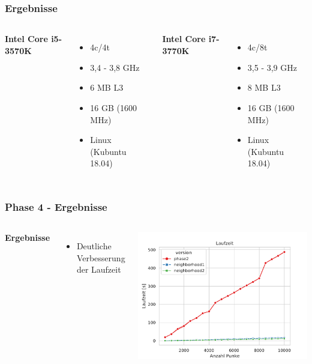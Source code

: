 \documentclass[aspectratio=169]{beamer}
\begin{document}
\begin{frame}
\frametitle{Ergebnisse}
\begin{columns}[c] %
	
	\textbf{Intel Core i5-3570K}
	\begin{itemize}
		\item 4c/4t
		\item 3,4 - 3,8 GHz
		\item 6 MB L3
		\item 16 GB (1600 MHz)
		\item Linux (Kubuntu 18.04)
	\end{itemize}
	
	\textbf{Intel Core i7-3770K}
	\begin{itemize}
		\item 4c/8t
		\item 3,5 - 3,9 GHz
		\item 8 MB L3
		\item 16 GB (1600 MHz)
		\item Linux (Kubuntu 18.04)
		
	\end{itemize}
\end{columns}
\end{frame}



\begin{frame}
\frametitle{Phase 4 - Ergebnisse}
\begin{columns}[c] %
	
	\textbf{Ergebnisse}
	\begin{itemize}
		\item Deutliche Verbesserung der Laufzeit
	\end{itemize}
	\includegraphics[scale=.45]{runtime_overview.pdf}	
\end{columns}
\end{frame}
\end{document}
